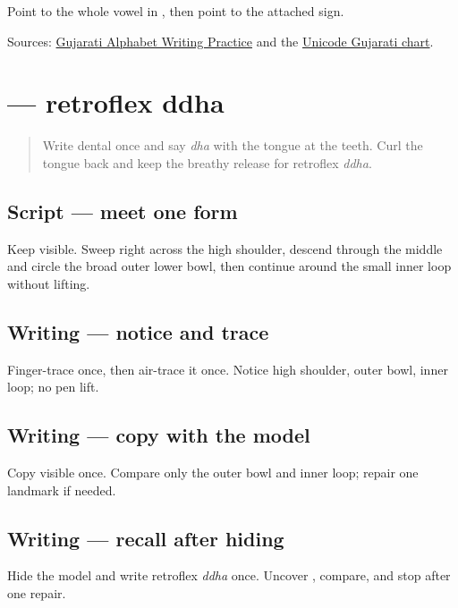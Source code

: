 \begin{tcolorbox}[breakable,colback=teal!4,colframe=teal!35!black,title={Before you move on}]
Point to the whole vowel in \textbf{ }, then point to the attached sign.

Sources: \href{https://www.t30apps.com/gujarati-alphabet-writing/}{Gujarati Alphabet Writing Practice} and the \href{https://www.unicode.org/charts/PDF/U0A80.pdf}{Unicode Gujarati chart}.
\end{tcolorbox}
\section[\texorpdfstring{\gu{ઢ} (ḍha)}{ઢ (ḍha)}]{ — retroflex ddha}

\label{lesson:GU-W07-ddha}



\begin{quote}
Write dental \textbf{} once and say \emph{dha} with the tongue at the teeth. Curl the tongue back and keep the breathy release for retroflex \emph{ddha}.
\end{quote}

\subsection*{Script — meet one form}
Keep \textbf{} visible. Sweep right across the high shoulder, descend through the middle and circle the broad outer lower bowl, then continue around the small inner loop without lifting.

\subsection*{Writing — notice and trace}

Finger-trace \textbf{} once, then air-trace it once. Notice high shoulder, outer bowl, inner loop; no pen lift.

\subsection*{Writing — copy with the model}
Copy visible \textbf{} once. Compare only the outer bowl and inner loop; repair one landmark if needed.

\subsection*{Writing — recall after hiding}
Hide the model and write retroflex \emph{ddha} once. Uncover \textbf{}, compare, and stop after one repair.

